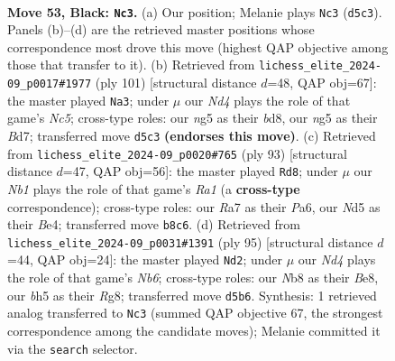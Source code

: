 \documentclass[11pt]{article}
\begin{document}
\clearpage

\begin{figure}[p]\centering
\begin{subfigure}{0.46\textwidth}\centering
\resizebox{\linewidth}{!}{%
\newchessgame
\chessboard[
  setfen={1nb2k2/r7/4p3/1P1n1pNB/1pN2P2/1P4P1/5K1P/1R6 b - - 6 53},
  showmover=false,
  pgfstyle=straightmove, color=movearrow, markmove={d5-c3}
]}
\caption{}
\end{subfigure}\hfill
\begin{subfigure}{0.46\textwidth}\centering
\resizebox{\linewidth}{!}{%
\newchessgame
\chessboard[
  setfen={3B4/3b1k2/1p3pp1/1P1p3p/2nN3P/4P1P1/5P2/5K2 b - - 5 51},
  showmover=false,
  pgfstyle=straightmove, color=movearrow, markmove={c4-a3}
]}
\caption{}
\end{subfigure}
\\[4pt]
\begin{subfigure}{0.46\textwidth}\centering
\resizebox{\linewidth}{!}{%
\newchessgame
\chessboard[
  setfen={r7/6k1/p1p5/4Np2/1p1PbPp1/6P1/PPP4R/2K5 b - - 3 47},
  showmover=false,
  pgfstyle=straightmove, color=movearrow, markmove={a8-d8}
]}
\caption{}
\end{subfigure}\hfill
\begin{subfigure}{0.46\textwidth}\centering
\resizebox{\linewidth}{!}{%
\newchessgame
\chessboard[
  setfen={4b1r1/8/kn6/4P2p/p1pPB2R/PnP1NP2/5K2/8 b - - 3 48},
  showmover=false,
  pgfstyle=straightmove, color=movearrow, markmove={b3-d2}
]}
\caption{}
\end{subfigure}
\caption{\textbf{Move 53, Black: \texttt{Nc3}.} (a) Our position; Melanie plays \texttt{Nc3} (\texttt{d5c3}). Panels (b)--(d) are the retrieved master positions whose correspondence most drove this move (highest QAP objective among those that transfer to it). (b) Retrieved from \texttt{lichess\_elite\_2024-09\_p0017\#1977} (ply 101) [structural distance $d$=48, QAP obj=67]: the master played \texttt{Na3}; under $\mu$ our \emph{Nd4} plays the role of that game's \emph{Nc5}; cross-type roles: our \emph{n}g5 as their \emph{b}d8, our \emph{n}g5 as their \emph{B}d7; transferred move \texttt{d5c3} \textbf{(endorses this move)}. (c) Retrieved from \texttt{lichess\_elite\_2024-09\_p0020\#765} (ply 93) [structural distance $d$=47, QAP obj=56]: the master played \texttt{Rd8}; under $\mu$ our \emph{Nb1} plays the role of that game's \emph{Ra1} (a \textbf{cross-type} correspondence); cross-type roles: our \emph{R}a7 as their \emph{P}a6, our \emph{N}d5 as their \emph{B}e4; transferred move \texttt{b8c6}. (d) Retrieved from \texttt{lichess\_elite\_2024-09\_p0031\#1391} (ply 95) [structural distance $d$=44, QAP obj=24]: the master played \texttt{Nd2}; under $\mu$ our \emph{Nd4} plays the role of that game's \emph{Nb6}; cross-type roles: our \emph{N}b8 as their \emph{B}e8, our \emph{b}h5 as their \emph{R}g8; transferred move \texttt{d5b6}. Synthesis: 1 retrieved analog transferred to \texttt{Nc3} (summed QAP objective 67, the strongest correspondence among the candidate moves); Melanie committed it via the \texttt{search} selector.}
\label{fig:thought-m105}
\end{figure}
\end{document}
